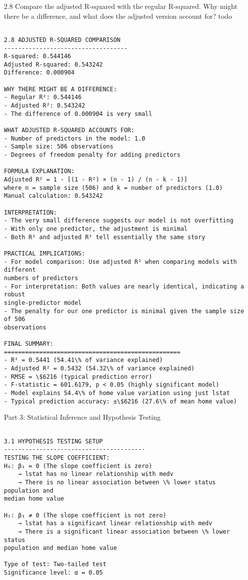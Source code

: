 \documentclass[11pt, twocolumn]{article}
\begin{document}
    2.8 Compare the adjusted R-squared with the regular R-squared. Why might
there be a difference, and what does the adjusted version account for?
todo

    \begin{Verbatim}[commandchars=\\\{\}]

2.8 ADJUSTED R-SQUARED COMPARISON
-----------------------------------
R-squared: 0.544146
Adjusted R-squared: 0.543242
Difference: 0.000904

WHY THERE MIGHT BE A DIFFERENCE:
- Regular R²: 0.544146
- Adjusted R²: 0.543242
- The difference of 0.000904 is very small

WHAT ADJUSTED R-SQUARED ACCOUNTS FOR:
- Number of predictors in the model: 1.0
- Sample size: 506 observations
- Degrees of freedom penalty for adding predictors

FORMULA EXPLANATION:
Adjusted R² = 1 - [(1 - R²) × (n - 1) / (n - k - 1)]
where n = sample size (506) and k = number of predictors (1.0)
Manual calculation: 0.543242

INTERPRETATION:
- The very small difference suggests our model is not overfitting
- With only one predictor, the adjustment is minimal
- Both R² and adjusted R² tell essentially the same story

PRACTICAL IMPLICATIONS:
- For model comparison: Use adjusted R² when comparing models with different
numbers of predictors
- For interpretation: Both values are nearly identical, indicating a robust
single-predictor model
- The penalty for our one predictor is minimal given the sample size of 506
observations

FINAL SUMMARY:
==================================================
- R² = 0.5441 (54.41\% of variance explained)
- Adjusted R² = 0.5432 (54.32\% of variance explained)
- RMSE = \$6216 (typical prediction error)
- F-statistic = 601.6179, p < 0.05 (highly significant model)
- Model explains 54.4\% of home value variation using just lstat
- Typical prediction accuracy: ±\$6216 (27.6\% of mean home value)
    \end{Verbatim}

    Part 3: Statistical Inference and Hypothesis Testing

    \begin{Verbatim}[commandchars=\\\{\}]

3.1 HYPOTHESIS TESTING SETUP
----------------------------------------
TESTING THE SLOPE COEFFICIENT:
H₀: β₁ = 0 (The slope coefficient is zero)
    → lstat has no linear relationship with medv
    → There is no linear association between \% lower status population and
median home value

H₁: β₁ ≠ 0 (The slope coefficient is not zero)
    → lstat has a significant linear relationship with medv
    → There is a significant linear association between \% lower status
population and median home value

Type of test: Two-tailed test
Significance level: α = 0.05
    \end{Verbatim}
\end{document}
